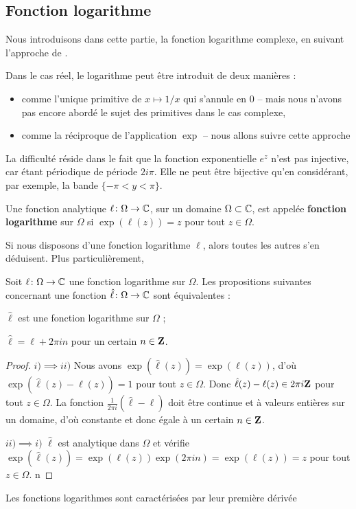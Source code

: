 \subsection{Fonction logarithme}

Nous introduisons dans cette partie, la fonction logarithme complexe, en suivant l'approche de \cite{remmert1991theory}. 

Dans le cas réel, le logarithme peut être introduit de deux manières : 
\begin{itemize} 
\item comme l'unique primitive de $x \mapsto 1/x$ qui s'annule en 0 -- mais nous n'avons pas encore abordé le sujet des primitives dans le cas complexe, 
\item comme la réciproque de l'application $\exp$ -- nous allons suivre cette approche 
\end{itemize} 

La difficulté réside dans le fait que la fonction exponentielle $e^z$ n'est pas injective, car étant périodique de période $2 i \pi$. Elle ne peut être bijective qu'en considérant, par exemple, la bande $\{ -\pi < y <\pi\}$. 

\begin{fdefn}
Une fonction analytique $\ell \colon  \Omega \to \mathbb{C}$, sur un domaine $\Omega \subset \mathbb{C}$, est appelée \textbf{fonction logarithme} sur $\Omega$ si $\exp(\ell( z)) = z$ pour tout $z \in \Omega$. 
\end{fdefn}
Si nous disposons d'une fonction logarithme $\ell$, alors toutes les autres s'en déduisent. Plus particulièrement,
\begin{prop}
Soit $\ell \colon \Omega \to \mathbb{C}$ une fonction logarithme sur $\Omega$. Les propositions suivantes concernant une fonction $\hat{\ell} \colon \Omega \to \mathbb{C}$ sont équivalentes :
\begin{MYenumerate}
\item $\hat{\ell}$ est une fonction logarithme sur $\Omega$ ;
\item $\hat{\ell} = \ell + 2 \pi i n$ pour un certain $n \in {\mathbf Z}$.
\end{MYenumerate}
\end{prop}

\begin{proof}
$i)\implies ii)$ Nous avons $\exp(\hat{\ell}(z))=\exp(\ell (z))$, d'où $\exp (\hat{\ell}(z)-\ell(z))=1$ pour tout $z \in \Omega$. Donc $\hat{\ell}(z)-\ell(z) \in 2 \pi i {\mathbf Z}$ pour tout $z \in \Omega$. La fonction $\frac{1}{2 \pi i}(\hat{\ell} -\ell)$ doit être continue et à valeurs entières sur un domaine, d'où constante et donc égale à un certain $n \in {\mathbf Z}$.

$ii) \implies i)$ $\hat{\ell}$ est analytique dans $\Omega$ et vérifie $\exp(\hat{\ell}(z))=\exp(\ell(z)) \exp(2 \pi i n)=\exp (\ell(z))=z$
pour tout $z \in \Omega$. n 
\end{proof}
Les fonctions logarithmes sont caractérisées par leur première dérivée

